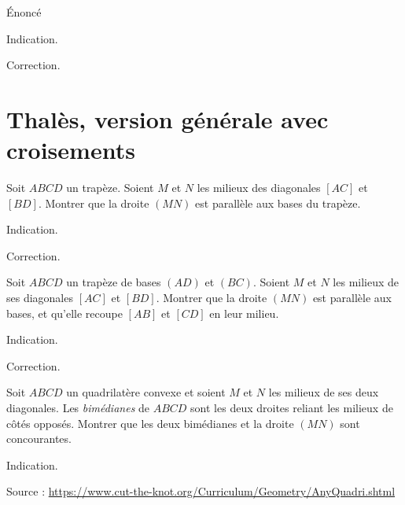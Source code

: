 \begin{exo}
Énoncé
\begin{hint}
Indication.
\end{hint}
\begin{sol}
Correction.
\end{sol}
\end{exo}

\section{Thalès, version générale avec croisements}

\begin{exo}
Soit $ABCD$ un trapèze.
Soient $M$ et $N$ les milieux des diagonales $[AC]$ et $[BD]$.
Montrer que la droite $(MN)$ est parallèle aux bases du trapèze.
\begin{hint}
Indication.
\end{hint}
\begin{sol}
Correction.
\end{sol}
\end{exo}

\begin{exo}

Soit $ABCD$ un trapèze de bases $(AD)$ et $(BC)$.
Soient $M$ et $N$ les milieux de ses diagonales $[AC]$ et $[BD]$.
Montrer que la droite $(MN)$ est parallèle aux bases, et qu'elle recoupe $[AB]$ et $[CD]$ en leur milieu.
\begin{hint}
Indication.
\end{hint}
\begin{sol}
Correction.
\end{sol}
\end{exo}

\begin{exo}[Bimédianes]
Soit $ABCD$ un quadrilatère convexe et soient $M$ et $N$ les milieux de ses deux diagonales.
Les \emph{bimédianes} de $ABCD$ sont les deux droites reliant les milieux de côtés opposés.
Montrer que les deux bimédianes et la droite $(MN)$ sont concourantes.
\begin{hint}
Indication.
\end{hint}
\begin{sol}
Source : \url{https://www.cut-the-knot.org/Curriculum/Geometry/AnyQuadri.shtml}
\end{sol}
\end{exo}

